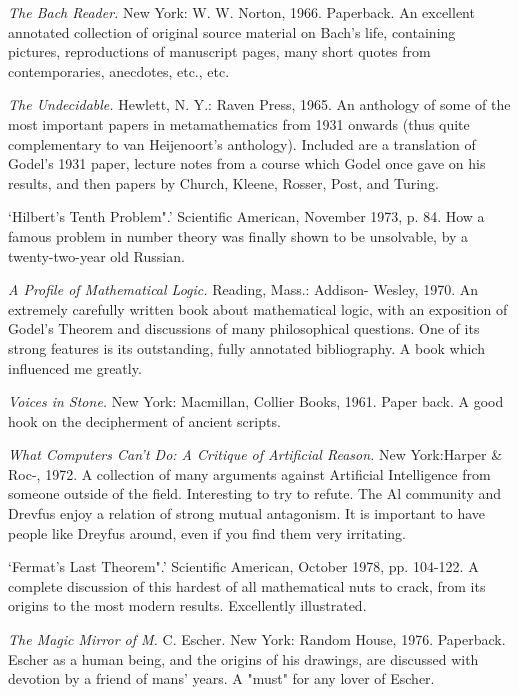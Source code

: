  {\sl The Bach Reader.} \llap{**\enspace}New York: W. W. Norton, 1966. Paperback. An excellent annotated collection of original source material on Bach's life, containing pictures, reproductions of manuscript pages, many short quotes from contemporaries, anecdotes, etc., etc.

 {\sl The Undecidable.} Hewlett, N. Y.: Raven Press, 1965. An anthology of some of the most important papers in metamathematics from 1931 onwards (thus quite complementary to van Heijenoort's anthology). Included are a translation of Godel's 1931 paper, lecture notes from a course which Godel once gave on his results, and then papers by Church, Kleene, Rosser, Post, and Turing.

 `Hilbert's Tenth Problem".' Scientific American, November 1973, p. 84. How a famous problem in number theory was finally shown to be unsolvable, by a twenty-two-year old Russian.

 {\sl A Profile of Mathematical Logic.} \llap{**\enspace}Reading, Mass.: Addison- Wesley, 1970. An extremely carefully written book about mathematical logic, with an exposition of Godel's Theorem and discussions of many philosophical questions. One of its strong features is its outstanding, fully annotated bibliography. A book which influenced me greatly.

 {\sl Voices in Stone.} New York: Macmillan, Collier Books, 1961. Paper back. A good hook on the decipherment of ancient scripts.

 {\sl What Computers Can't Do: A Critique of Artificial Reason.} \llap{*\enspace}New York:Harper \& Roc-, 1972. A collection of many arguments against Artificial Intelligence from someone outside of the field. Interesting to try to refute. The Al community and Drevfus enjoy a relation of strong mutual antagonism. It is important to have people like Dreyfus around, even if you find them very irritating.

 `Fermat's Last Theorem".' Scientific American, October 1978, pp. 104-122. A complete discussion of this hardest of all mathematical nuts to crack, from its origins to the most modern results. Excellently illustrated.

 {\sl The Magic Mirror of M.} \llap{*\enspace}C. Escher. New York: Random House, 1976. Paperback. Escher as a human being, and the origins of his drawings, are discussed with devotion by a friend of mans' years. A "must" for any lover of Escher.

